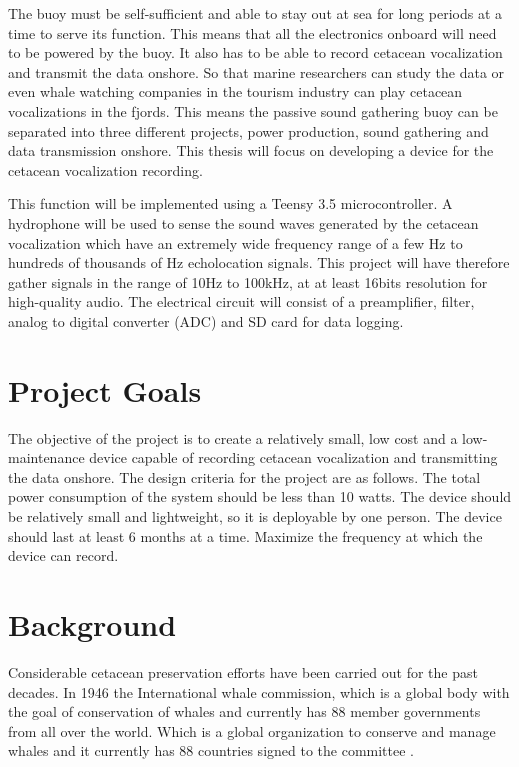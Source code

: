 The buoy must be self-sufficient and able to stay out at sea for long periods at a time to serve its function.
This means that all the electronics onboard will need to be powered by the buoy.
It also has to be able to record cetacean vocalization and transmit the data onshore.
So that marine researchers can study the data or even whale watching companies in the tourism industry can play cetacean vocalizations in the fjords.
This means the passive sound gathering buoy can be separated into three different projects, power production, sound gathering and data transmission onshore.
This thesis will focus on developing a device for the cetacean vocalization recording.

This function will be implemented using a Teensy 3.5 microcontroller.
A hydrophone will be used to sense the sound waves generated by the cetacean vocalization which have an extremely wide frequency range of a few Hz to hundreds of thousands of Hz echolocation signals. This project will have therefore gather signals in the range of 10Hz to 100kHz, at at least 16bits resolution for high-quality audio.
The electrical circuit will consist of a preamplifier, filter, analog to digital converter (ADC) and SD card for data logging.

\section{Project Goals}

The objective of the project is to create a relatively small, low cost and a low-maintenance device capable of recording cetacean vocalization and transmitting the data onshore.
The design criteria for the project are as follows.
The total power consumption of the system should be less than 10 watts. 
The device should be relatively small and lightweight, so it is deployable by one person.
The device should last at least 6 months at a time.
Maximize the frequency at which the device can record.
\clearpage

\section{Background}

Considerable cetacean preservation efforts have been carried out for the past decades.
In 1946 the International whale commission, which is a global body with the goal of conservation of whales and currently has 88 member governments from all over the world.
Which is a global organization to conserve and manage whales and it currently has 88 countries signed to the committee \cite{noauthor_iwc_nodate}.

